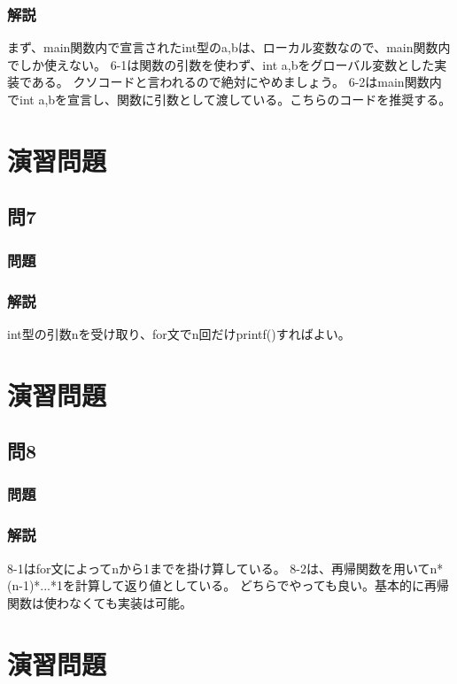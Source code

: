 \subsubsection{解説}

まず、main関数内で宣言されたint型のa,bは、ローカル変数なので、main関数内でしか使えない。
6-1は関数の引数を使わず、int a,bをグローバル変数とした実装である。
クソコードと言われるので絶対にやめましょう。
6-2はmain関数内でint a,bを宣言し、関数に引数として渡している。こちらのコードを推奨する。

\section{演習問題}
\subsection{問7}
\subsubsection{問題}

\subsubsection{解説}

int型の引数nを受け取り、for文でn回だけprintf()すればよい。

\section{演習問題}
\subsection{問8}
\subsubsection{問題}


\subsubsection{解説}

8-1はfor文によってnから1までを掛け算している。
8-2は、再帰関数を用いてn*(n-1)*...*1を計算して返り値としている。
どちらでやっても良い。基本的に再帰関数は使わなくても実装は可能。

\section{演習問題}
